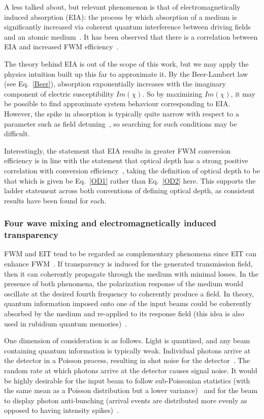 \documentclass[aps,pra,showpacs,amsmath,amssymb,nofootinbib,longbibliography,superscriptaddress
]{revtex4-1}
\theoremstyle{definition}
\theoremstyle{remark}
\newcommand{\0}{\hat{0}}
\begin{document}
A less talked about, but relevant phenomenon is that of electromagnetically induced absorption (EIA): the process by which absorption of a medium is significantly increased via coherent quantum interference between driving fields and an atomic medium~\cite{Lezama}. It has been observed that there is a correlation between EIA and increased FWM efficiency~\cite{Goren}\cite{Lee}.

The theory behind EIA is out of the scope of this work, but we may apply the physics intuition built up this far to approximate it. By the Beer-Lambert law (see Eq.~\eqref{Beer}), absorption exponentially increases with the imaginary component of electric susceptibility $Im(\chi)$. So by maximizing $Im(\chi)$, it may be possible to find approximate system behaviour corresponding to EIA. However, the spike in absorption is typically quite narrow with respect to a parameter such as field detuning~\cite{Goren}\cite{Lee}, so searching for such conditions may be difficult.

Interestingly, the statement that EIA results in greater FWM conversion efficiency is in line with the statement that optical depth has a strong positive correlation with conversion efficiency~\cite{Zhang}, taking the definition of optical depth to be that which is given be Eq.~\eqref{OD1} rather than Eq.~\eqref{OD2} here. This supports the ladder statement across both conventions of defining optical depth, as consistent results have been found for each.


\subsubsection{Four wave mixing and electromagnetically induced transparency}

FWM and EIT tend to be regarded as complementary phenomena since EIT can enhance FWM~\cite{Xiao}. If transparency is induced for the generated transmission field, then it can coherently propagate through the medium with minimal losses. In the presence of both phenomena, the polarization response of the medium would oscillate at the desired fourth frequency to coherently produce a field. In theory, quantum information imposed onto one of the input beams could be coherently absorbed by the medium and re-applied to its response field (this idea is also used in rubidium quantum memories)~\cite{Glorieux}.

One dimension of consideration is as follows. Light is quantized, and any beam containing quantum information is typically weak. Individual photons arrive at the detector in a Poisson process, resulting in shot noise for the detector~\cite{Souza}. The random rate at which photons arrive at the detector causes signal noise. It would be highly desirable for the input beam to follow sub-Poissonian statistics (with the same mean as a Poisson distribution but a lower variance)~\cite{Souza} and for the beam to display photon anti-bunching (arrival events are distributed more evenly as opposed to having intensity spikes)~\cite{FWM}.
\end{document}

